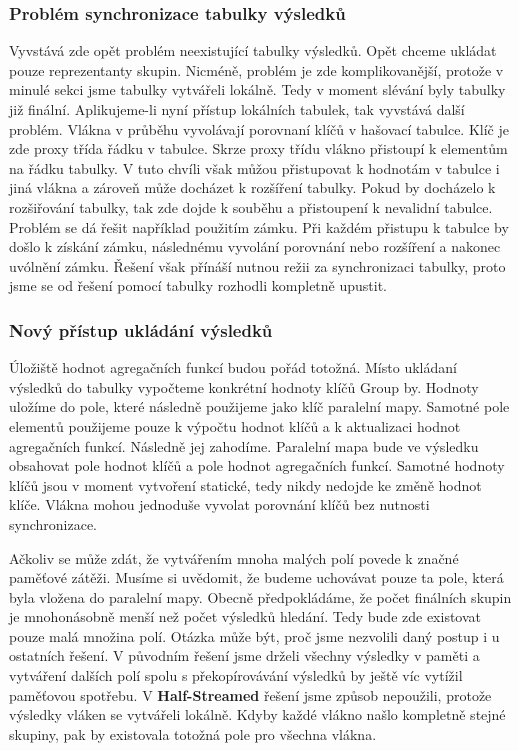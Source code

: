 \subsubsection{Problém synchronizace tabulky výsledků}

Vyvstává zde opět problém neexistující tabulky výsledků.
Opět chceme ukládat pouze reprezentanty skupin.
Nicméně, problém je zde komplikovanější, protože v minulé sekci jsme tabulky vytvářeli lokálně.
Tedy v moment slévání byly tabulky již finální. 
Aplikujeme-li nyní přístup lokálních tabulek, tak vyvstává další problém.
Vlákna v průběhu vyvolávají porovnaní klíčů v hašovací tabulce.
Klíč je zde proxy třída řádku v tabulce.
Skrze proxy třídu vlákno přistoupí k elementům na řádku tabulky.
V tuto chvíli však můžou přistupovat k hodnotám v tabulce i jiná vlákna a zároveň může docházet k rozšíření tabulky.
Pokud by docházelo k rozšiřování tabulky, tak zde dojde k souběhu a přistoupení k nevalidní tabulce.
Problém se dá řešit například použitím zámku.
Při každém přistupu k tabulce by došlo k získání zámku, následnému vyvolání porovnání nebo rozšíření a nakonec uvólnění zámku.
Řešení však přínáší nutnou režii za synchronizaci tabulky, proto jsme se od řešení pomocí tabulky rozhodli kompletně upustit.

\subsubsection{Nový přístup ukládání výsledků}

Úložiště hodnot agregačních funkcí budou pořád totožná.
Místo ukládaní výsledků do tabulky vypočteme konkrétní hodnoty klíčů Group by.
Hodnoty uložíme do pole, které následně použijeme jako klíč paralelní mapy.  
Samotné pole elementů použijeme pouze k výpočtu hodnot klíčů a k aktualizaci hodnot agregačních funkcí.
Následně jej zahodíme.
Paralelní mapa bude ve výsledku obsahovat pole hodnot klíčů a pole hodnot agregačních funkcí.
Samotné hodnoty klíčů jsou v moment vytvoření statické, tedy nikdy nedojde ke změně hodnot klíče.
Vlákna mohou jednoduše vyvolat porovnání klíčů bez nutnosti synchronizace.

Ačkoliv se může zdát, že vytvářením mnoha malých polí povede k značné paměťové zátěži.
Musíme si uvědomit, že budeme uchovávat pouze ta pole, která byla vložena do paralelní mapy.
Obecně předpokládáme, že počet finálních skupin je mnohonásobně menší než počet výsledků hledání.
Tedy bude zde existovat pouze malá množina polí.
Otázka může být, proč jsme nezvolili daný postup i u ostatních řešení.
V původním řešení jsme drželi všechny výsledky v paměti a vytváření dalších polí spolu s překopírovávání výsledků by ještě víc vytížil paměťovou spotřebu.
V \textbf{Half-Streamed} řešení jsme způsob nepoužili, protože výsledky vláken se vytvářeli lokálně.
Kdyby každé vlákno našlo kompletně stejné skupiny, pak by existovala totožná pole pro všechna vlákna.

